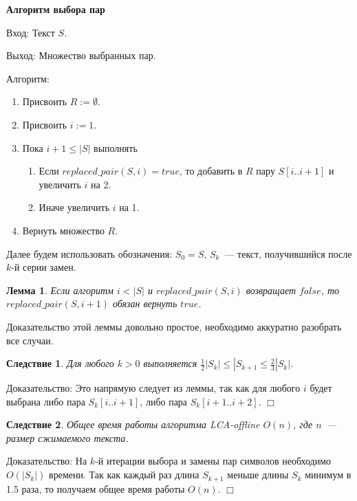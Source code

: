 \documentclass[14pt]{article}
\newtheorem{lemma}{Лемма}[section]
\newtheorem{corollary}{Следствие}[section]
\begin{document}
{\bf Алгоритм выбора пар}

{\sc Вход:} Текст $S$.

{\sc Выход:} Множество выбранных пар.

{\sc Алгоритм:}

\begin{enumerate}
	\item Присвоить $R := \emptyset$.
	\item Присвоить $i := 1$.
	\item Пока $i + 1 \leq |S|$ выполнять
	\begin{enumerate}
		\item Если $replaced\_pair(S, i) = true$, то добавить в $R$ пару $S[i..i+1]$ и увеличить $i$ на 2.
		\item Иначе увеличить $i$ на 1.
	\end{enumerate}
	\item Вернуть множество $R$.
\end{enumerate}

Далее будем использовать обозначения: $S_0 = S$, $S_k$~--- текст, получившийся после $k$-й серии замен.

\begin{lemma}
	Если алгоритм $i < |S|$ и $replaced\_pair(S, i)$ возвращает $false$, то
	$replaced\_pair(S, i + 1)$ обязан вернуть $true$.
\end{lemma}

Доказательство этой леммы довольно простое, необходимо аккуратно разобрать все случаи.

\begin{corollary}
	Для любого $k > 0$ выполняется $\frac{1}{2}|S_k| \leq |S_{k+1} \leq \frac{2}{3}|S_k|$.
\end{corollary}

{\sc Доказательство:} Это напрямую следует из леммы, так как для любого $i$ будет выбрана
либо пара $S_k[i..i+1]$, либо пара $S_k[i+1..i+2]$. $\Box$

\begin{corollary}
	Общее время работы алгоритма LCA-offline $O(n)$, где $n$~--- размер сжимаемого текста.
\end{corollary}

{\sc Доказательство:} На $k$-й итерации выбора и замены пар символов необходимо $O(|S_k|)$ времени. Так как каждый раз
длина $S_{k+1}$ меньше длины $S_k$ минимум в 1.5 раза, то получаем общее время работы $O(n)$. $\Box$

\end{document}
